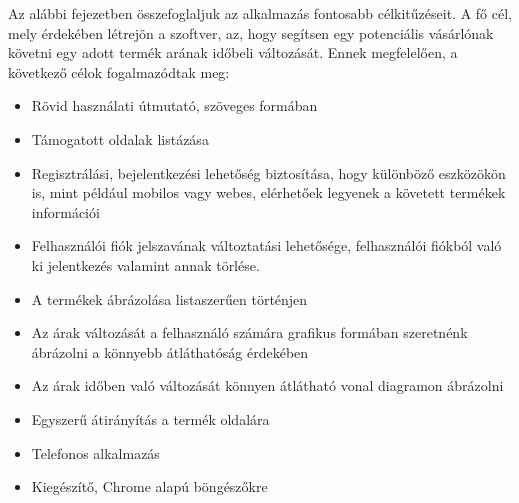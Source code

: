 Az alábbi fejezetben összefoglaljuk az alkalmazás fontosabb célkitűzéseit. A fő cél, mely érdekében létrejön a szoftver, az, hogy segítsen egy potenciális vásárlónak követni egy adott termék arának időbeli változását. Ennek megfelelően, a következő célok fogalmazódtak meg:
\begin{itemize}
    \item Rövid használati útmutató, szöveges formában
    \item Támogatott oldalak listázása
    \item Regisztrálási, bejelentkezési lehetőség biztosítása, hogy különböző eszközökön is, mint például mobilos vagy webes, elérhetőek legyenek a követett termékek információi
    \item Felhasználói fiók jelszavának változtatási lehetősége, felhasználói fiókból való ki jelentkezés valamint annak törlése.
    \item A termékek ábrázolása listaszerűen történjen
    \item Az árak változását a felhasználó számára grafikus formában szeretnénk ábrázolni a könnyebb átláthatóság érdekében
    \item Az árak időben való változását könnyen átlátható vonal diagramon ábrázolni
    \item Egyszerű átirányítás a termék oldalára
    \item Telefonos alkalmazás
	\item Kiegészítő, Chrome alapú böngészőkre
\end{itemize}